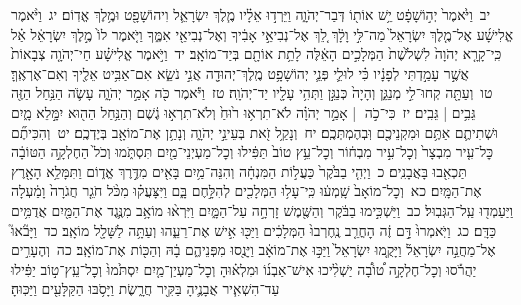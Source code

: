 \documentclass[18pt]{article}
\newcommand{\vart}[1]{\Bfootnote{#1}}	%
\newcommand{\kri}[1]{\Afootnote{#1}}	%
\begin{document}
 {\loc יב~}וַיֹּ֙אמֶר֙ יְה֣וֹשָׁפָ֔ט יֵ֥שׁ אוֹת֖וֹ דְּבַר־יְהֹוָ֑ה וַיֵּרְד֣וּ אֵלָ֗יו מֶ֧לֶךְ יִשְׂרָאֵ֛ל וִיהוֹשָׁפָ֖ט וּמֶ֥לֶךְ אֱדֽוֹם׃ \startlock
 {\loc יג~}וַיֹּ֨אמֶר אֱלִישָׁ֜ע אֶל־מֶ֤לֶךְ יִשְׂרָאֵל֙ מַה־לִּ֣י וָלָ֔ךְ לֵ֚ךְ אֶל־נְבִיאֵ֣י אָבִ֔יךָ וְאֶל־נְבִיאֵ֖י אִמֶּ֑ךָ וַיֹּ֤אמֶר לוֹ֙ מֶ֣לֶךְ יִשְׂרָאֵ֔ל אַ֗ל כִּֽי־קָרָ֤א יְהֹוָה֙ לִשְׁלֹ֙שֶׁת֙ הַמְּלָכִ֣ים הָאֵ֔לֶּה לָתֵ֥ת אוֹתָ֖ם בְּיַד־מוֹאָֽב׃ \startlock
 {\loc יד~}וַיֹּ֣אמֶר אֱלִישָׁ֗ע חַי־יְהֹוָ֤ה צְבָאוֹת֙ אֲשֶׁ֣ר עָמַ֣דְתִּי לְפָנָ֔יו כִּ֗י לוּלֵ֛י פְּנֵ֛י יְהוֹשָׁפָ֥ט מֶֽלֶךְ־יְהוּדָ֖ה אֲנִ֣י נֹשֵׂ֑א אִם־אַבִּ֥יט אֵלֶ֖יךָ וְאִם־אֶרְאֶֽךָּ׃ \startlock
 {\loc טו~}וְעַתָּ֖ה קְחוּ־לִ֣י מְנַגֵּ֑ן וְהָיָה֙ כְּנַגֵּ֣ן  \edtext{הַֽמְנַגֵּ֔ן}{\vart{א=הַֽמֲנַגֵּ֔ן | }}  וַתְּהִ֥י עָלָ֖יו יַד־יְהֹוָֽה׃ \startlock
 {\loc טז~}וַיֹּ֕אמֶר כֹּ֖ה אָמַ֣ר יְהֹוָ֑ה עָשֹׂ֛ה הַנַּ֥חַל הַזֶּ֖ה גֵּבִ֥ים  |  גֵּבִֽים׃ \startlock
 {\loc יז~}כִּי־כֹ֣ה  |  אָמַ֣ר יְהֹוָ֗ה לֹא־תִרְא֥וּ ר֙וּחַ֙ וְלֹא־תִרְא֣וּ גֶ֔שֶׁם וְהַנַּ֥חַל הַה֖וּא יִמָּ֣לֵא מָ֑יִם וּשְׁתִיתֶ֛ם אַתֶּ֥ם וּמִקְנֵיכֶ֖ם וּֽבְהֶמְתְּכֶֽם׃ \startlock
 {\loc יח~}וְנָקַ֥ל זֹ֖את בְּעֵינֵ֣י יְהֹוָ֑ה וְנָתַ֥ן אֶת־מוֹאָ֖ב בְּיֶדְכֶֽם׃ \startlock
 {\loc יט~}וְהִכִּיתֶ֞ם כׇּל־עִ֤יר מִבְצָר֙ וְכׇל־עִ֣יר מִבְח֔וֹר וְכׇל־עֵ֥ץ טוֹב֙ תַּפִּ֔ילוּ וְכׇל־מַעְיְנֵי־מַ֖יִם תִּסְתֹּ֑מוּ וְכֹל֙ הַחֶלְקָ֣ה הַטּוֹבָ֔ה תַּכְאִ֖בוּ בָּאֲבָנִֽים׃ \startlock
 {\loc כ~}וַיְהִ֤י בַבֹּ֙קֶר֙ כַּעֲל֣וֹת הַמִּנְחָ֔ה וְהִנֵּה־מַ֥יִם בָּאִ֖ים מִדֶּ֣רֶךְ אֱד֑וֹם וַתִּמָּלֵ֥א הָאָ֖רֶץ אֶת־הַמָּֽיִם׃ \startlock
 {\loc כא~}וְכׇל־מוֹאָב֙ שָֽׁמְע֔וּ כִּֽי־עָל֥וּ הַמְּלָכִ֖ים לְהִלָּ֣חֶם בָּ֑ם וַיִּצָּעֲק֗וּ מִכֹּ֨ל חֹגֵ֤ר חֲגֹרָה֙ וָמַ֔עְלָה וַיַּעַמְד֖וּ עַֽל־הַגְּבֽוּל׃ \startlock
 {\loc כב~}וַיַּשְׁכִּ֣ימוּ בַבֹּ֔קֶר וְהַשֶּׁ֖מֶשׁ זָרְחָ֣ה עַל־הַמָּ֑יִם וַיִּרְא֨וּ מוֹאָ֥ב מִנֶּ֛גֶד אֶת־הַמַּ֖יִם אֲדֻמִּ֥ים כַּדָּֽם׃ \startlock
 {\loc כג~}וַיֹּֽאמְרוּ֙ דָּ֣ם זֶ֔ה  הׇחֳרֵ֤ב  נֶֽחֶרְבוּ֙ הַמְּלָכִ֔ים וַיַּכּ֖וּ אִ֣ישׁ אֶת־רֵעֵ֑הוּ וְעַתָּ֥ה לַשָּׁלָ֖ל מוֹאָֽב׃ \startlock
 {\loc כד~}וַיָּבֹ֘אוּ֮ אֶל־מַחֲנֵ֣ה יִשְׂרָאֵל֒ וַיָּקֻ֤מוּ יִשְׂרָאֵל֙ וַיַּכּ֣וּ אֶת־מוֹאָ֔ב וַיָּנֻ֖סוּ מִפְּנֵיהֶ֑ם  \edtext{(ויבו)}{\kri{קרי: וַיַּ֨כּוּ־}} בָ֔הּ וְהַכּ֖וֹת אֶת־מוֹאָֽב׃ \startlock
 {\loc כה~}וְהֶעָרִ֣ים יַהֲרֹ֡סוּ וְכׇל־חֶלְקָ֣ה ט֠וֹבָ֠ה יַשְׁלִ֨יכוּ אִישׁ־אַבְנ֜וֹ וּמִלְא֗וּהָ וְכׇל־מַעְיַן־מַ֤יִם יִסְתֹּ֙מוּ֙ וְכׇל־עֵֽץ־ט֣וֹב יַפִּ֔ילוּ עַד־הִשְׁאִ֧יר אֲבָנֶ֛יהָ בַּקִּ֖יר חֲרָ֑שֶׂת וַיָּסֹ֥בּוּ הַקַּלָּעִ֖ים וַיַּכּֽוּהָ׃ \startlock
\end{document}
